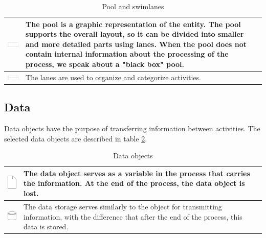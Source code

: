 \documentclass[thesis=M,english]{FITthesis}[2019/12/23]
\begin{document}
\begin{table}[ht!]
\caption{Pool and swimlanes} \label{tablePool}
\begin{center}
\begin{tabular}{ | p{3cm} | m{8cm} | } \hline
    \includegraphics[width=3cm]{assets/BPNMicons/Bazen.pdf} & The pool is a graphic representation of the entity. The pool supports the overall layout, so it can be divided into smaller and more detailed parts using lanes. When the pool does not contain internal information about the processing of the process, we speak about a "black box" pool. \\   \hline
    \includegraphics[width=3cm]{assets/BPNMicons/Draha.pdf} & The lanes are used to organize and categorize activities.  \\ \hline
\end{tabular}
\end{center}
\end{table}


\subsection{Data}
Data objects have the purpose of transferring information between activities. The selected data objects are described in table \ref{tableData}.

\begin{table}[ht!]
\caption{Data objects} \label{tableData}
\begin{center}
\begin{tabular}{ | p{1cm} | m{8cm} | } \hline
    \includegraphics[width=1cm]{assets/BPNMicons/dataObject.pdf} & The data object serves as a variable in the process that carries the information. At the end of the process, the data object is lost. \\   \hline
    \includegraphics[width=1cm]{assets/BPNMicons/databaseobject.pdf} & The data storage serves similarly to the object for transmitting information, with the difference that after the end of the process, this data is stored.  \\ \hline
\end{tabular}
\end{center}
\end{table}
\end{document}
